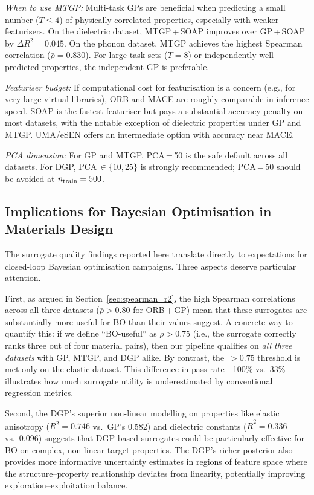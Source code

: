 \emph{When to use MTGP:} Multi-task GPs are beneficial when predicting a small number ($T \leq 4$) of physically correlated properties, especially with weaker featurisers.
On the dielectric dataset, MTGP\,+\,SOAP improves over GP\,+\,SOAP by $\Delta R^2 = 0.045$.
On the phonon dataset, MTGP achieves the highest Spearman correlation ($\bar{\rho} = 0.830$).
For large task sets ($T = 8$) or independently well-predicted properties, the independent GP is preferable.

\emph{Featuriser budget:} If computational cost for featurisation is a concern (e.g., for very large virtual libraries), ORB and MACE are roughly comparable in inference speed.
SOAP is the fastest featuriser but pays a substantial accuracy penalty on most datasets, with the notable exception of dielectric properties under GP and MTGP.
UMA/eSEN offers an intermediate option with accuracy near MACE.

\emph{PCA dimension:} For GP and MTGP, PCA\,=\,50 is the safe default across all datasets.
For DGP, PCA\,$\in \{10, 25\}$ is strongly recommended; PCA\,=\,50 should be avoided at $n_{\text{train}} = 500$.

\FloatBarrier
\subsection{Implications for Bayesian Optimisation in Materials Design}
\label{sec:bo_implications}

The surrogate quality findings reported here translate directly to expectations for closed-loop Bayesian optimisation campaigns.
Three aspects deserve particular attention.

First, as argued in Section~\ref{sec:spearman_r2}, the high Spearman correlations across all three datasets ($\bar{\rho} > 0.80$ for ORB\,+\,GP) mean that these surrogates are substantially more useful for BO than their \Rtwo{} values suggest.
A concrete way to quantify this: if we define ``BO-useful'' as $\bar{\rho} > 0.75$ (i.e., the surrogate correctly ranks three out of four material pairs), then our pipeline qualifies on \emph{all three datasets} with GP, MTGP, and DGP alike.
By contrast, the \Rtwo{}\,$> 0.75$ threshold is met only on the elastic dataset.
This difference in pass rate---100\% vs.\ 33\%---illustrates how much surrogate utility is underestimated by conventional regression metrics.

Second, the DGP's superior non-linear modelling on properties like elastic anisotropy ($R^2 = 0.746$ vs.\ GP's 0.582) and dielectric constants ($\bar{R}^2 = 0.336$ vs.\ 0.096) suggests that DGP-based surrogates could be particularly effective for BO on complex, non-linear target properties.
The DGP's richer posterior also provides more informative uncertainty estimates in regions of feature space where the structure--property relationship deviates from linearity, potentially improving exploration--exploitation balance.

